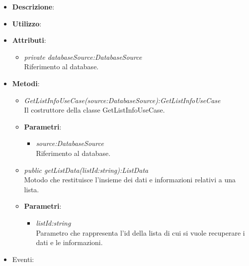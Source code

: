 \begin{itemize}
\item \textbf{Descrizione}: 
\item \textbf{Utilizzo}:
\item \textbf{Attributi}: 
	\begin{itemize}
	\item \textit{private databaseSource:DatabaseSource}\\
		Riferimento al database.
	\end{itemize}
\item \textbf{Metodi}:
	\begin{itemize}
	\item \textit{GetListInfoUseCase(source:DatabaseSource):GetListInfoUseCase}\\
	Il costruttore della classe GetListInfoUseCase.
			\item{\textbf{Parametri}: \begin{itemize}
			\item \textit{source:DatabaseSource}\\
		Riferimento al database.
			\end{itemize}}
	\item \textit{public getListData(listId:string):ListData}\\
	Motodo che restituisce l'insieme dei dati e informazioni relativi a una lista.
				\item{\textbf{Parametri}: \begin{itemize}
				\item \textit{listId:string}\\
				Parametro che rappresenta l'id della lista di cui si vuole recuperare i dati e le informazioni.
				\end{itemize}}
	\end{itemize}
\item{Eventi}:
\end{itemize}